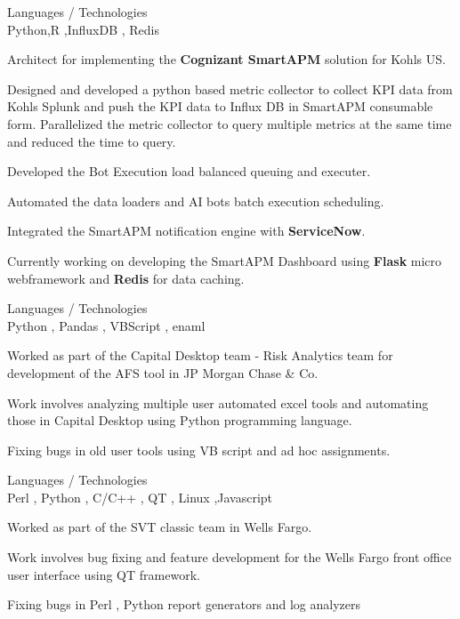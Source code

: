 \documentclass[a4,10pt]{cv4tw}
\begin{document}
{Languages / Technologies \\Python,R ,InfluxDB , Redis}
	{
	\begin{missions}
		\item Architect for implementing the \textbf{Cognizant SmartAPM} solution for Kohls US.
		\item Designed and developed a python based metric collector to collect KPI data from Kohls Splunk and push the KPI data to Influx DB in SmartAPM consumable form. Parallelized the metric collector to query multiple metrics at the same time and reduced the time to query.
    \item Developed the Bot Execution load balanced queuing  and executer.
		\item Automated the data loaders and AI bots batch execution scheduling.
    \item Integrated the SmartAPM notification engine with \textbf{ServiceNow}.
    \item Currently working on developing the SmartAPM Dashboard using \textbf{Flask} micro webframework and  \textbf{Redis} for data caching.
	\end{missions}
}

{Languages / Technologies \\Python , Pandas , VBScript , enaml }
	{
	\begin{missions}
		\item Worked as part of the Capital Desktop team - Risk Analytics team for development of the AFS tool in JP Morgan Chase \& Co.
		\item Work involves analyzing multiple user automated excel tools and automating those in Capital Desktop using Python programming language.
		\item Fixing bugs in old user tools using VB script and ad hoc assignments.
	\end{missions}
}
{Languages / Technologies \\Perl , Python , C/C++ , QT , Linux ,Javascript}
	{
	\begin{missions}
		\item Worked as part of the SVT classic team in Wells Fargo.
		\item Work involves bug fixing and feature development for the Wells Fargo front office user interface using QT framework.
		\item Fixing bugs in Perl , Python report generators and log analyzers
	\end{missions}
}
\end{document}
